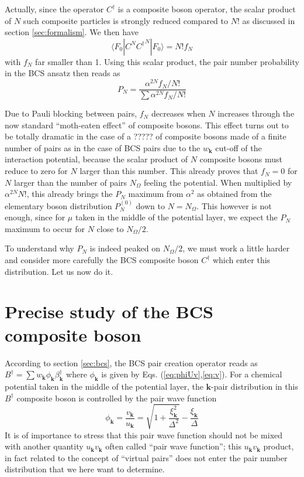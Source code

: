\documentclass[aps,prb,preprint,groupedaddress,amsmath]{revtex4}
\newcommand{\vk}{\ensuremath{\mathbf{k}}}
\newcommand{\dg}{\ensuremath{\dagger}}
\begin{document}
Actually,  since the operator $C^\dg$ is a composite boson operator, the scalar product of $N$ such composite particles is strongly reduced compared to $N!$ as discussed in section \ref{sec:formalism}.  We then have 
\begin{equation}
\langle{}F_0|{C}^N{C^\dg}^N|F_0{\rangle}=N!f_N
\end{equation}
with $f_N$ far smaller than 1.  Using this scalar product, the pair number probability in the BCS ansatz then reads as
\begin{equation}
P_N=\frac{\alpha^{2N}f_N/N!}{\sum\alpha^{2N}f_N/N!}
\end{equation}

Due to  Pauli blocking between pairs,  $f_N$ decreases when $N$ increases through the now standard ``moth-eaten effect'' of composite bosons. This effect turns out to be totally dramatic in the case of a ?????  of composite bosons made of a finite number of pairs as in the case of BCS pairs due to the  $w_\vk$ cut-off of  the interaction potential, because the scalar product of $N$ composite bosons must reduce to zero for $N$ larger than this number.  This already proves that $f_N=0$ for $N$ larger than the number of pairs $N_\Omega$ feeling the potential.  When multiplied by $\alpha^{2N}N!$, this already brings the $P_N$ maximum from $\alpha^2$ as obtained from the elementary boson distribution $P_N^{(0)}$ down to $N=N_\Omega$. This however is not enough, since   for $\mu$ taken in the middle of the potential layer, we expect the $P_N$ maximum to occur for $N$ close to $N_\Omega/2$.

To understand why $P_N$ is indeed peaked on $N_\Omega/2$, we must work a little harder and consider more carefully the BCS composite boson $C^\dg$ which enter this distribution.  Let us now do it.  
\section{Precise study of the BCS composite boson}
According to section \ref{sec:bcs}, the BCS pair creation operator reads as  $B^\dg=\sum{}w_\vk\phi_\vk\beta^\dg_\vk$ where $\phi_\vk$ is given by Eqs. (\ref{eq:phiUv},\ref{eq:v}).  For a chemical potential taken in the middle of the potential layer, the $\vk$-pair distribution in this  $B^\dg$ composite boson is  controlled by the pair wave function
\begin{equation}
\phi_\vk=\frac{v_\vk}{u_\vk}=\sqrt{1+\frac{\xi_\vk^2}{\Delta^2}}-\frac{\xi_\vk}{\Delta}
\end{equation}
It is of importance to stress that this pair wave function should not be mixed with another quantity $u_\vk{}v_\vk$ often called ``pair wave function''; this $u_\vk{}v_\vk$ product, in fact related to the concept of ``virtual pairs'' does not enter the pair number distribution that we here want to determine.   
\end{document}
